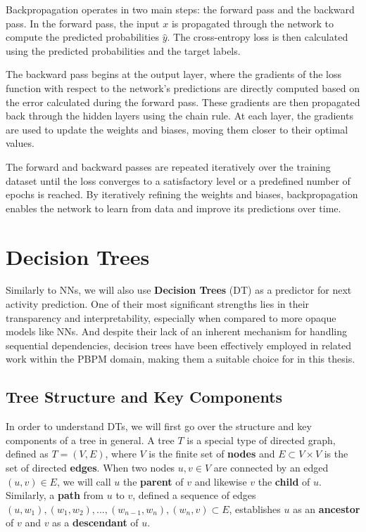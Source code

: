 Backpropagation operates in two main steps: the forward pass and the backward pass.
In the forward pass,
the input $x$ is propagated through the network to compute the predicted probabilities $\hat{y}$.
The cross-entropy loss is then calculated using the predicted probabilities and the target labels.

The backward pass begins at the output layer,
where the gradients of the loss function with respect to the network's predictions are directly computed
based on the error calculated during the forward pass.
These gradients are then propagated back through the hidden layers using the chain rule.
At each layer, the gradients are used to update the weights and biases,
moving them closer to their optimal values.

The forward and backward passes are repeated iteratively over the training dataset
until the loss converges to a satisfactory level or a predefined number of epochs is reached.
By iteratively refining the weights and biases,
backpropagation enables the network to learn from data and improve its predictions over time.

\section{Decision Trees}
\label{sec:dt}
Similarly to NNs, we will also use \textbf{Decision Trees} (DT) \cite{decision_trees} as a predictor for next activity prediction.
One of their most significant strengths lies in their transparency and interpretability,
especially when compared to more opaque models like NNs.
And despite their lack of an inherent mechanism for handling sequential dependencies,
decision trees have been effectively employed in related work \cite{fairness_foundation} within the PBPM domain,
making them a suitable choice for in this thesis. 

\subsection{Tree Structure and Key Components}
In order to understand DTs, we will first go over the structure and key components of a tree in general.
\cite{trees}
A tree $T$ is a special type of directed graph, defined as $T=(V,E)$,
where $V$ is the finite set of \textbf{nodes} and $E \subset V \times V$ is the set of directed \textbf{edges}.
When two nodes $u,v \in V$ are connected by an edged $(u,v) \in E$,
we will call $u$ the \textbf{parent} of $v$ and likewise $v$ the \textbf{child} of $u$.
Similarly, a \textbf{path} from $u$ to $v$,
defined a sequence of edges $(u,w_1), (w_1,w_2), ..., (w_{n-1},w_n),(w_n, v) \subset E$,
establishes $u$ as an \textbf{ancestor} of $v$ and $v$ as a \textbf{descendant} of $u$.

